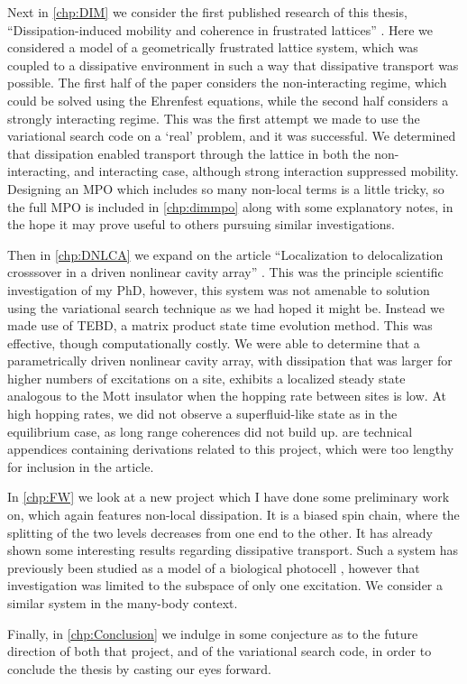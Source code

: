 Next in \cref{chp:DIM} we consider the first published research of this thesis, ``Dissipation-induced mobility and coherence in frustrated lattices'' \cite{Owen2017}. Here we considered a model of a geometrically frustrated lattice system, which was coupled to a dissipative environment in such a way that dissipative transport was possible. The first half of the paper considers the non-interacting regime, which could be solved using the Ehrenfest equations, while the second half considers a strongly interacting regime. This was the first attempt we made to use the variational search code on a `real' problem, and it was successful. We determined that dissipation enabled transport through the lattice in both the non-interacting, and interacting case, although strong interaction suppressed mobility. Designing an MPO which includes so many non-local terms is a little tricky, so the full MPO is included in \cref{chp:dimmpo} along with some explanatory notes, in the hope it may prove useful to others pursuing similar investigations.

Then in \cref{chp:DNLCA} we expand on the article ``Localization to delocalization crosssover in a driven nonlinear cavity array'' \cite{Brown2018}. This was the principle scientific investigation of my PhD, however, this system was not amenable to solution using the variational search technique as we had hoped it might be. Instead we made use of TEBD, a matrix product state time evolution method. This was effective, though computationally costly. We were able to determine that a parametrically driven nonlinear cavity array, with dissipation that was larger for higher numbers of excitations on a site, exhibits a localized steady state analogous to the Mott insulator when the hopping rate between sites is low. At high hopping rates, we did not observe a superfluid-like state as in the equilibrium case, as long range coherences did not build up.  are technical appendices containing derivations related to this project, which were too lengthy for inclusion in the article.

In \cref{chp:FW} we look at a new project which I have done some preliminary work on, which again features non-local dissipation. It is a biased spin chain, where the splitting of the two levels decreases from one end to the other. It has already shown some interesting results regarding dissipative transport. Such a system has previously been studied as a model of a biological photocell \cite{Fruchtman2016}, however that investigation was limited to the subspace of only one excitation. We consider a similar system in the many-body context. 

Finally, in \cref{chp:Conclusion} we indulge in some conjecture as to the future direction of both that project, and of the variational search code, in order to conclude the thesis by casting our eyes forward. 
